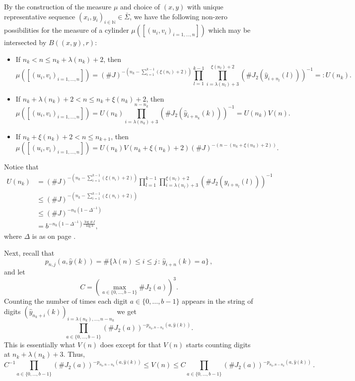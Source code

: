 \documentclass[12pt]{article}
\theoremstyle{remark}
\numberwithin{equation}{section}
\renewcommand{\Bbb}[1]{\mathbb{#1}}
\newcommand{\N}{{\Bbb N}}         %
\newcommand{\0}{\mathbf{0}}
\begin{document}
By the construction of the measure $\mu$ and choice of $(x,y)$ with unique representative sequence \mbox{$(x_{i},y_{i})_{i\in\N} \in \bar{\Sigma}$}, we have the following non-zero possibilities for the measure of a cylinder $\mu([(u_{i},v_{i})_{i=1, \dots , n}])$ which may be intersected by $B((x,y),r)$:
\begin{itemize}
\item{If $n_{k}< n \leq n_{k}+\lambda(n_{k})+2$, then 
\begin{equation*}
     \mu([(u_{i},v_{i})_{i=1, \dots , n}]) =(\#J)^{-\left( n_{k}-\sum_{i=1}^{k-1}(\xi(n_{i})+2) \right)}\prod_{l=1}^{k-1}\prod_{i=\lambda(n_{l})+3}^{\xi(n_{l})+2}(\#J_{2}(\hat{y}_{i+n_{l}}(l)))^{-1}=:U(n_{k}).
\end{equation*}}
\item{If $n_{k}+\lambda(n_{k})+2<n \leq n_{k}+\xi(n_{k})+2$, then  
\begin{equation*}
     \mu([(u_{i},v_{i})_{i=1, \dots , n}])= U(n_{k})\prod_{i=\lambda(n_{k})+3}^{n-n_{k}}(\#J_{2}(\hat{y}_{i+n_{k}}(k)))^{-1} = U(n_{k})V(n).
\end{equation*}}
\item{If $n_{k}+\xi(n_{k})+2<n \leq n_{k+1}$, then
\begin{equation*}
     \mu([(u_{i},v_{i})_{i=1, \dots , n}])=U(n_{k})V(n_{k}+\xi(n_{k})+2)(\#J)^{-(n-(n_{k}+\xi(n_{k})+2))}.
\end{equation*}}
\end{itemize}


Notice that \label{T bound}
\begin{align*}
U(n_{k}) &= (\#J)^{-\left( n_{k}-\sum_{i=1}^{k-1}(\xi(n_{i})+2) \right)}\prod_{l=1}^{k-1}\prod_{i=\lambda(n_{l})+3}^{\xi(n_{l})+2}\left(\#J_{2}(\hat{y}_{i+n_{l}}(l))\right)^{-1} \\[1ex] 
     &\leq (\#J)^{-(n_{k}-\sum_{i=1}^{k-1}(\xi(n_{i})+2))} \\[1ex]
     &\leq (\#J)^{-n_{k}(1-\Delta^{-1})} \\[1ex]
     &=b^{-n_{k}(1-\Delta^{-1})\frac{\log\#J}{\log b}},
\end{align*} 
where $\Delta$ is as on page \pageref{Delta def}.

Next, recall that
 \begin{equation*}
     p_{n,j}(a,\hat{y}(k))=\#\{\lambda(n) \leq i \leq j \, : \, \hat{y}_{i+n}(k)=a \}\, , 
 \end{equation*}
and let
\[C=\left(\max_{a \in \{0, \dots , b-1\}}\#J_{2}(a)\right)^{3}.\] 
Counting the number of times each digit $a\in\{0,\dots,b-1\}$ appears in the string of digits $\left(\hat{y}_{n_{k}+i}(k)\right)_{i=\lambda(n_{k}),\ldots, n-n_{k}}$ we get 
\[\prod_{a \in \{0, \dots , b-1\}}(\#J_{2}(a))^{-p_{n_{k},n-n_{k}}(a,\hat{y}(k))}.\] This is essentially what $V(n)$ does except for that $V(n)$ starts counting digits at $n_{k}+\lambda(n_{k})+3$. Thus,
 \begin{equation*}
 C^{-1}\prod_{a \in \{0, \dots , b-1\}}(\#J_{2}(a))^{-p_{n_{k},n-n_{k}}(a,\hat{y}(k))} \leq  V(n) \leq C \prod_{a \in \{0, \dots , b-1\}}(\#J_{2}(a))^{-p_{n_{k},n-n_{k}}(a,\hat{y}(k))}\,.
 \end{equation*}
 
\end{document}
